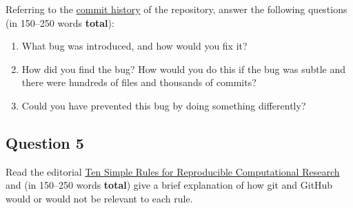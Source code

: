 \documentclass[11pt,onecolumn]{scrartcl}
\begin{document}
Referring to the \href{https://github.com/aezarebski/biology-github-tutorial/commits/main}{commit history} of the repository, answer the following
questions (in 150--250 words \textbf{total}):

\begin{enumerate}
\item What bug was introduced, and how would you fix it?
\item How did you find the bug? How would you do this if the bug was subtle and
there were hundreds of files and thousands of commits?
\item Could you have prevented this bug by doing something differently?
\end{enumerate}

\subsection{Question 5}
\label{sec:org43784d6}

Read the editorial \href{https://doi.org/10.1371/journal.pcbi.1003285}{Ten Simple Rules for Reproducible Computational Research} and
(in 150--250 words \textbf{total}) give a brief explanation of how git and GitHub would
or would not be relevant to each rule.
\end{document}
